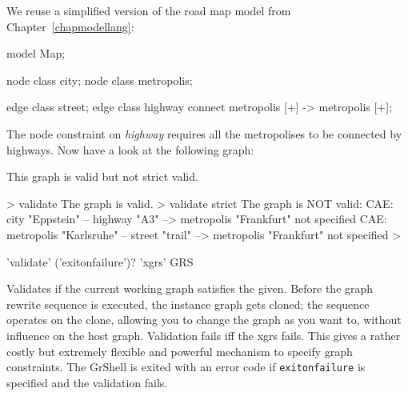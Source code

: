 \begin{example}
We reuse a simplified version of the road map model from Chapter~\ref{chapmodellang}:
\begin{grgen} 
model Map;

node class city;
node class metropolis;

edge class street;
edge class highway
      connect metropolis [+] -> metropolis [+];
\end{grgen}
The node constraint on \emph{highway} requires all the metropolises to be connected by highways. Now have a look at the following graph:
\begin{center}
\end{center}

This graph is valid but not strict valid.
\begin{grshell} 
> validate
The graph is valid.
> validate strict
The graph is NOT valid:
  CAE: city "Eppstein" -- highway "A3" --> metropolis "Frankfurt" not specified
  CAE: metropolis "Karlsruhe" -- street "trail" --> metropolis "Frankfurt" not specified
>
\end{grshell}
\end{example}

\begin{rail}
  'validate' ('exitonfailure')? 'xgrs' GRS
\end{rail}
Validates if the current working graph satisfies the  given.
Before the graph rewrite sequence is executed, the instance graph gets cloned;
the sequence operates on the clone, allowing you to change the graph as you want to, without influence on the host graph.
Validation fails iff the xgrs fails.
This gives a rather costly but extremely flexible and powerful mechanism to specify graph constraints.
The GrShell is exited with an error code if \texttt{exitonfailure} is specified and the validation fails.


